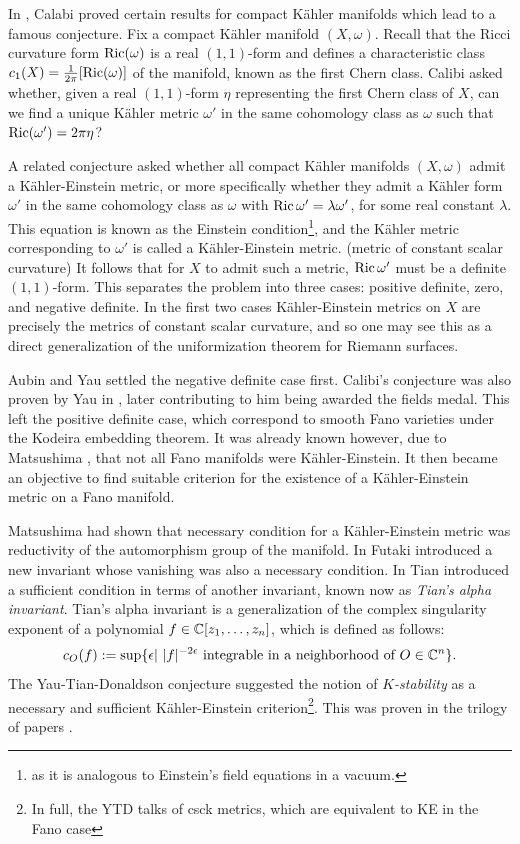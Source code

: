 In \cite{calabi54,calabi57}, Calabi proved certain results for compact K\"ahler manifolds which lead to a famous conjecture. Fix a compact K\"ahler manifold \((X,\omega)\). Recall that the Ricci curvature form \(\mathop{\rm Ric}\nolimits(\omega)\) is a real \((1,1)\)-form and defines a characteristic class \(c_1(X) = \frac{1}{2 \pi} [ \mathop{\rm Ric}\nolimits(\omega)] \) of the manifold, known as the first Chern class. Calibi asked whether, given a real \((1,1)\)-form \( \eta \) representing the first Chern class of \(X\), can we find a unique K\"ahler metric \(\omega'\) in the same cohomology class as \(\omega\) such that \(\mathop{\rm Ric}\nolimits(\omega') = 2 \pi \eta\)?

A related conjecture asked whether all compact K\"ahler manifolds \((X,\omega)\) admit a K\"ahler-Einstein metric, or more specifically whether they admit a K\"ahler form \(\omega'\) in the same cohomology class as \(\omega\) with \(\mathop{\rm Ric}\nolimits \omega' = \lambda \omega'\), for some real constant \(\lambda\). This equation is known as the Einstein condition\footnote{as it is analogous to Einstein's field equations in a vacuum.}, and the K\"ahler metric corresponding to \(\omega'\) is called a K\"ahler-Einstein metric. (metric of constant scalar curvature) It follows that for \(X\) to admit such a metric, \(\mathop{\rm Ric}\nolimits \omega'\) must be a definite \((1,1)\)-form. This separates the problem into three cases: positive definite, zero, and negative definite. In the first two cases K\"ahler-Einstein metrics on \(X\) are precisely the metrics of constant scalar curvature, and so one may see this as a direct generalization of the uniformization theorem for Riemann surfaces.

Aubin \cite{Aubin1976} and Yau \cite{Yau1977} settled the negative definite case first. Calibi's conjecture was also proven by Yau in \cite{Yau1977}, later contributing to him being awarded the fields medal. This left the positive definite case, which correspond to smooth Fano varieties under the Kodeira embedding theorem. It was already known however, due to Matsushima \cite{matsushima1957structure}, that not all Fano manifolds were K\"ahler-Einstein. It then became an objective to find suitable criterion for the existence of a K\"ahler-Einstein metric on a Fano manifold.

Matsushima had shown that necessary condition for a K\"ahler-Einstein metric was reductivity of the automorphism group of the manifold. In \cite{futaki1983obstruction} Futaki introduced a new invariant whose vanishing was also a necessary condition. In \cite{tian1987kahler} Tian introduced a sufficient condition in terms of another invariant, known now as \textit{Tian's alpha invariant}.
Tian's alpha invariant is a generalization of the complex singularity exponent of a polynomial \(f \in \mathbb{C}[z_1,\dots,z_n]\), which is defined as follows:
\[
c_O(f) := \sup \{ \epsilon | \ |f|^{-2 \epsilon} \text{ integrable  in a neighborhood of } O \in \mathbb{C}^n \} .
\]
The Yau-Tian-Donaldson conjecture suggested the notion of \textit{ \(K\)-stability} as a necessary and sufficient K\"ahler-Einstein criterion\footnote{In full, the YTD talks of csck metrics, which are equivalent to KE in the Fano case}. This was proven in the trilogy of papers \cite{chen2015kahler1,chen2015kahler2,chen2015kahler3}.

